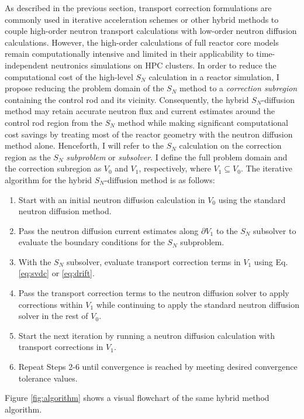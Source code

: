 As described in the previous section, transport correction formulations are commonly used in
iterative acceleration schemes or other hybrid methods to couple high-order neutron transport
calculations with low-order neutron diffusion calculations. However, the high-order calculations of
full reactor core models remain computationally intensive and limited in their applicability to
time-independent neutronics simulations on \gls{HPC} clusters.
In order to reduce the computational cost of the high-level $S_N$ calculation in a reactor
simulation, I propose reducing the problem domain of the $S_N$ method to a
\textit{correction subregion} containing the control rod
and its vicinity. Consequently, the hybrid $S_N$-diffusion method may retain accurate neutron flux
and current estimates around the control rod region from the $S_N$ method while making significant
computational cost savings by treating most of the reactor geometry with the neutron diffusion
method alone. Henceforth, I will refer to the $S_N$ calculation on the correction
region as the $S_N$ \textit{subproblem} or \textit{subsolver}. I define the full problem
domain and the correction subregion as $V_0$ and $V_1$, respectively, where
$V_1\subseteq V_0$. The iterative algorithm for the hybrid $S_N$-diffusion method is as follows:
%
\begin{enumerate}
  \item Start with an initial neutron diffusion calculation in $V_0$ using the standard neutron
    diffusion method.
  \item Pass the neutron diffusion current estimates along
    $\partial V_1$ to the $S_N$ subsolver to evaluate the boundary conditions for the $S_N$
    subproblem.
  \item With the $S_N$ subsolver, evaluate transport correction terms in $V_1$ using Eq.
    \ref{eq:svdc} or \ref{eq:drift}.
  \item Pass the transport correction terms to the neutron diffusion solver to apply corrections
    within $V_1$ while continuing to apply the standard neutron diffusion solver
    in the rest of $V_0$.
  \item Start the next iteration by running a neutron diffusion calculation with transport
    corrections in $V_1$.
  \item Repeat Steps 2-6 until convergence is reached by meeting desired convergence tolerance
    values.
\end{enumerate}
%
Figure \ref{fig:algorithm} shows a visual flowchart of the same hybrid method algorithm.

